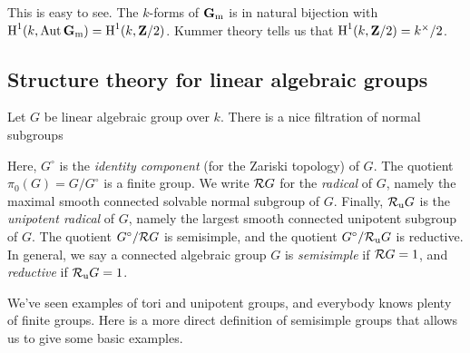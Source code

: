 \begin{hard}
This is easy to see. The $k$-forms of $\mathbf{G}_\mathrm{m}$ is in natural bijection with
$\operatorname{H}^1(k,\operatorname{Aut} \mathbf{G}_\mathrm{m})=\operatorname{H}^1(k,\mathbf{Z}/2)$. Kummer theory tells us that 
$\operatorname{H}^1(k,\mathbf{Z}/2)=k^\times/2$. 
\end{hard}





\subsection{Structure theory for linear algebraic groups}

Let $G$ be linear algebraic group over $k$. There is a nice filtration of normal 
subgroups 
\begin{center}
\end{center}

Here, $G^\circ$ is the \emph{identity component} (for the Zariski topology) of 
$G$. The quotient $\pi_0(G)=G/G^\circ$ is a finite group. We write 
$\mathcal{R} G$ for the \emph{radical} of $G$, namely the maximal smooth connected 
solvable normal subgroup of $G$. Finally, $\mathcal{R}_\mathrm{u} G$ is the \emph{unipotent 
radical} of $G$, namely the largest smooth connected unipotent subgroup of 
$G$. The quotient $G^\circ/\mathcal{R} G$ is semisimple, and the quotient 
$G^\circ/\mathcal{R}_\mathrm{u} G$ is reductive. In general, we say a connected algebraic 
group $G$ is \emph{semisimple} if $\mathcal{R} G=1$, and \emph{reductive} if 
$\mathcal{R}_\mathrm{u} G=1$. 

We've seen examples of tori and unipotent groups, and everybody knows plenty of 
finite groups. Here is a more direct definition of semisimple groups that 
allows us to give some basic examples. 

